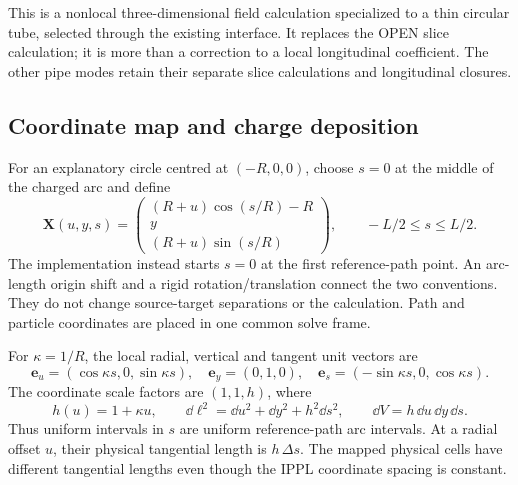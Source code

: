 This is a nonlocal three-dimensional field calculation specialized to a thin
circular tube, selected through the existing  interface. It
replaces the OPEN slice calculation; it is more than a correction to a local
longitudinal coefficient. The other pipe modes retain their separate slice
calculations and longitudinal closures.

\clearpage
\subsection{Coordinate map and charge deposition}
For an explanatory circle centred at $(-R,0,0)$, choose $s=0$ at the middle
of the charged arc and define
\begin{equation}
 \bm X(u,y,s)=
 \begin{pmatrix}(R+u)\cos(s/R)-R\\ y\\(R+u)\sin(s/R)\end{pmatrix},
 \qquad -L/2\le s\le L/2.
 \label{eq:mg-map}
\end{equation}
The implementation instead starts $s=0$ at the first reference-path point.
An arc-length origin shift and a rigid rotation/translation connect the two
conventions. They do not change source-target separations or the calculation.
Path and particle coordinates are placed in one common solve frame.

For $\kappa=1/R$, the local radial, vertical and tangent unit vectors are
\begin{equation}
 \bm e_u=(\cos\kappa s,0,\sin\kappa s),\quad
 \bm e_y=(0,1,0),\quad
 \bm e_s=(-\sin\kappa s,0,\cos\kappa s).
 \label{eq:mg-basis}
\end{equation}
The coordinate scale factors are $(1,1,h)$, where
\begin{equation}
 h(u)=1+\kappa u,\qquad
 \dd\ell^2=\dd u^2+\dd y^2+h^2\dd s^2,\qquad
 \dd V=h\,\dd u\,\dd y\,\dd s.
 \label{eq:mg-metric}
\end{equation}
Thus uniform intervals in $s$ are uniform reference-path arc intervals.
At a radial offset $u$, their physical tangential length is $h\,\Delta s$.
The mapped physical cells have different tangential lengths even though the
IPPL coordinate spacing is constant.

